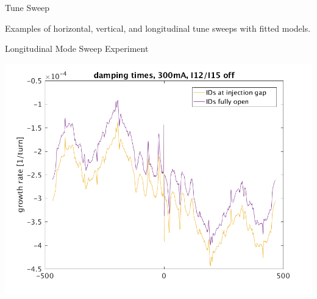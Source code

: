 \documentclass[xcolor=table]{beamer}
\begin{document}
%
\begin{frame}{Tune Sweep}

Examples of horizontal, vertical, and longitudinal tune sweeps with fitted
models.


\end{frame}


%
\begin{frame}{Longitudinal Mode Sweep Experiment}

\includegraphics[width=\linewidth]{mode_sweep.png}

\end{frame}
\end{document}
